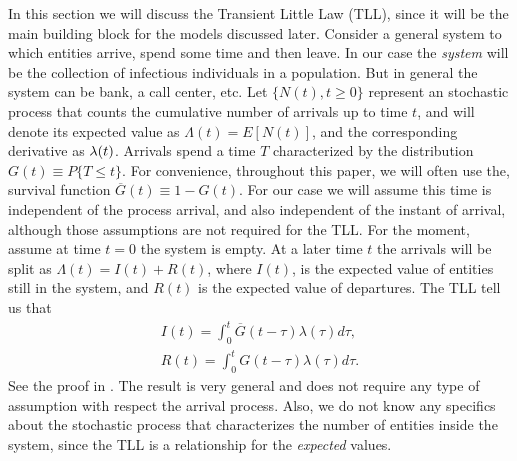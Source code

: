 \documentclass[USenglish,10pt]{article}
\newcommand{\Gb}{\overline{G}\xspace}
\newcommand{\la}{\ensuremath\lambda\xspace}
\begin{document}
In this section we will discuss the Transient Little Law (TLL)\cite{fral.ea:tll}, since it will be the main building block for the models discussed later.
Consider a general system to which entities arrive, spend some time and then leave. In our case the \emph{system} will be the collection of infectious individuals in a population.
But in general the system can be bank, a call center, etc. Let $\{N(t),t\geq 0\}$ represent an stochastic process that counts the cumulative number of arrivals  up to time $t$, and will denote its expected value as $\Lambda(t)=E[N(t)]$, and the corresponding derivative as $\la(t)$.
Arrivals spend a time $T$ characterized by the distribution  $G(t) \equiv P\{T\leq t\}$.
For convenience, throughout this paper, we will often use the, survival function $\Gb(t) \equiv 1-G(t)$.
For our case we will assume this time is independent of the process arrival, and also independent of the instant of arrival, although those assumptions are not required for the TLL.
For the moment, assume at time $t=0$ the system is empty. At a later time $t$ the arrivals will be split as $\Lambda(t)=I(t)+R(t)$, where  $I(t)$, is the expected value of entities still in the system, and  $R(t)$ is the expected value of departures. The TLL tell us that
\begin{align}
I(t) = \int_0^t \Gb(t-\tau) \lambda(\tau)d\tau,   \label{eq:tll0_i} \\
R(t) = \int_0^t G(t-\tau)  \lambda(\tau)d\tau .  \label{eq:tll0_r}
\end{align}
See the proof in \cite{fral.ea:tll}.
The result is very general and does not require any type of assumption with respect the arrival process.
Also, we do not know any specifics about the stochastic process that characterizes the number of entities inside the system, since the TLL is a relationship for the \emph{expected} values.
\end{document}
